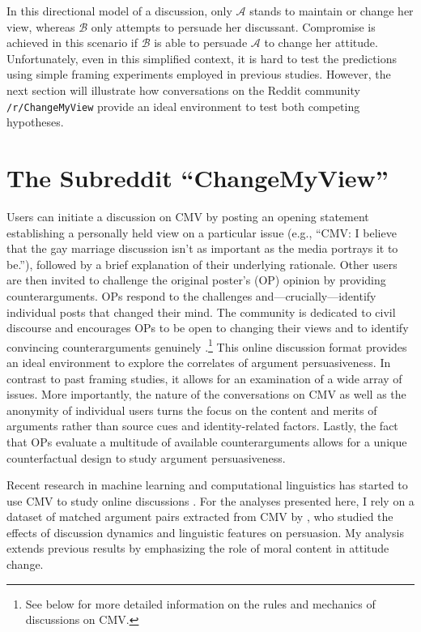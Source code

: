 In this directional model of a discussion, only $\mathcal{A}$ stands to maintain or change her view, whereas $\mathcal{B}$ only attempts to persuade her discussant. Compromise is achieved in this scenario if $\mathcal{B}$ is able to persuade $\mathcal{A}$ to change her attitude. Unfortunately, even in this simplified context, it is hard to test the predictions using simple framing experiments employed in previous studies. However, the next section will illustrate how conversations on the Reddit  community \texttt{/r/ChangeMyView} provide an ideal environment to test both competing hypotheses.



\section{The Subreddit ``ChangeMyView''}

	Users can initiate a discussion on CMV by posting an opening statement establishing a personally held view on a particular issue (e.g., ``CMV: I believe that the gay marriage discussion isn't as important as the media portrays it to be.''), followed by a brief explanation of their underlying rationale. Other users are then invited to challenge the original poster's (OP) opinion by providing counterarguments. OPs respond to the challenges and---crucially---identify individual posts that changed their mind. The community is dedicated to civil discourse and encourages OPs to be open to changing their views and to identify convincing counterarguments genuinely \citep[e.g.,][]{jhaver2017designing}.\footnote{See below for more detailed information on the rules and mechanics of discussions on CMV.} This online discussion format provides an ideal environment to explore the correlates of argument persuasiveness. In contrast to past framing studies, it allows for an examination of a wide array of issues. More importantly, the nature of the conversations on CMV as well as the anonymity of individual users turns the focus on the content and merits of arguments rather than source cues and identity-related factors. Lastly, the fact that OPs evaluate a multitude of available counterarguments allows for a unique counterfactual design to study argument persuasiveness.

	Recent research in machine learning and computational linguistics has started to use CMV to study online discussions \citep{wei2016post,hidey2017analyzing}. For the analyses presented here, I rely on a dataset of matched argument pairs extracted from CMV by \citet{tan2016winning}, who studied the effects of discussion dynamics and linguistic features on persuasion. My analysis extends previous results by emphasizing the role of moral content in attitude change. 


